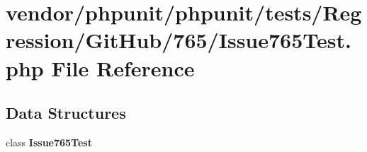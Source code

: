 \section{vendor/phpunit/phpunit/tests/\+Regression/\+Git\+Hub/765/\+Issue765\+Test.php File Reference}
\label{_issue765_test_8php}
\subsection*{Data Structures}
\begin{DoxyCompactItemize}
\item 
class {\bf Issue765\+Test}
\end{DoxyCompactItemize}
